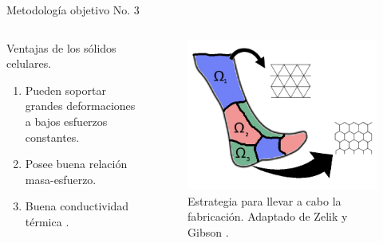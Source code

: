 \documentclass[10pt]{beamer}
\begin{document}
\begin{frame}{Metodología objetivo No. 3}

\begin{columns}[t]


\column{50 mm}
\begin{block}{{\footnotesize{}Ventajas de los sólidos celulares.}}

\begin{enumerate}
\item Pueden soportar grandes deformaciones a bajos esfuerzos constantes.
\item Posee buena relación masa-esfuerzo.
\item Buena conductividad térmica \cite{Gibson1997}.
\end{enumerate}
\end{block}

\column{70 mm}

\begin{figure}
\begin{centering}
\includegraphics[scale=0.25]{Feathergraphics/honeycomb}
\par\end{centering}
\caption{{\scriptsize{Estrategia para llevar a cabo la fabricación. Adaptado de Zelik \cite{Zelik2010} y Gibson \cite{Gibson1997}.}}}
\end{figure}

\end{columns}

\end{frame}
\end{document}
